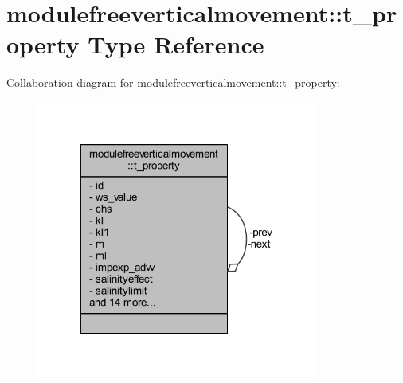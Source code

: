 \hypertarget{structmodulefreeverticalmovement_1_1t__property}{}\section{modulefreeverticalmovement\+:\+:t\+\_\+property Type Reference}
\label{structmodulefreeverticalmovement_1_1t__property}


Collaboration diagram for modulefreeverticalmovement\+:\+:t\+\_\+property\+:\nopagebreak
\begin{figure}[H]
\begin{center}
\leavevmode
\includegraphics[width=260pt]{structmodulefreeverticalmovement_1_1t__property__coll__graph}
\end{center}
\end{figure}
